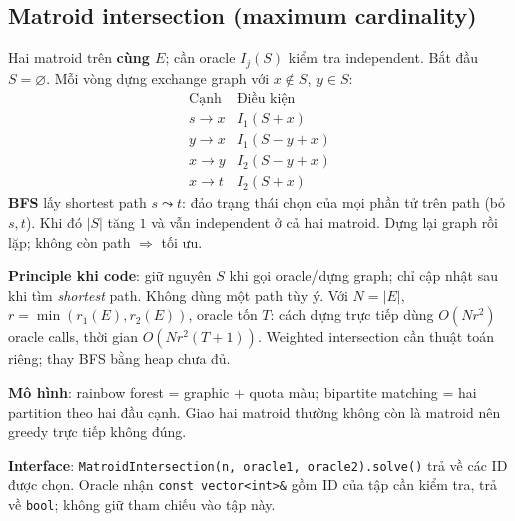 \subsection{Matroid intersection (maximum cardinality)}
Hai matroid trên \textbf{cùng $E$}; cần oracle $I_j(S)$ kiểm tra independent. Bắt đầu $S=\varnothing$. Mỗi vòng dựng exchange graph với $x\notin S$, $y\in S$:
\[
\begin{array}{c|l}
\text{Cạnh} & \text{Điều kiện} \\
s\to x & I_1(S+x) \\
y\to x & I_1(S-y+x) \\
x\to y & I_2(S-y+x) \\
x\to t & I_2(S+x)
\end{array}
\]
\textbf{BFS} lấy shortest path $s\leadsto t$: đảo trạng thái chọn của mọi phần tử trên path (bỏ $s,t$). Khi đó $|S|$ tăng $1$ và vẫn independent ở cả hai matroid. Dựng lại graph rồi lặp; không còn path $\Rightarrow$ tối ưu.

\textbf{Principle khi code}: giữ nguyên $S$ khi gọi oracle/dựng graph; chỉ cập nhật sau khi tìm \emph{shortest} path. Không dùng một path tùy ý. Với $N=|E|$, $r=\min(r_1(E),r_2(E))$, oracle tốn $T$: cách dựng trực tiếp dùng $O(Nr^2)$ oracle calls, thời gian $O(Nr^2(T+1))$. Weighted intersection cần thuật toán riêng; thay BFS bằng heap chưa đủ.

\textbf{Mô hình}: rainbow forest = graphic + quota màu; bipartite matching = hai partition theo hai đầu cạnh. Giao hai matroid thường không còn là matroid nên greedy trực tiếp không đúng.

\textbf{Interface}: \texttt{MatroidIntersection(n, oracle1, oracle2).solve()} trả về các ID được chọn. Oracle nhận \texttt{const vector<int>\&} gồm ID của tập cần kiểm tra, trả về \texttt{bool}; không giữ tham chiếu vào tập này.
\inputminted{compactcpp}{source/cpp/graph/matroid_intersection.cpp}
